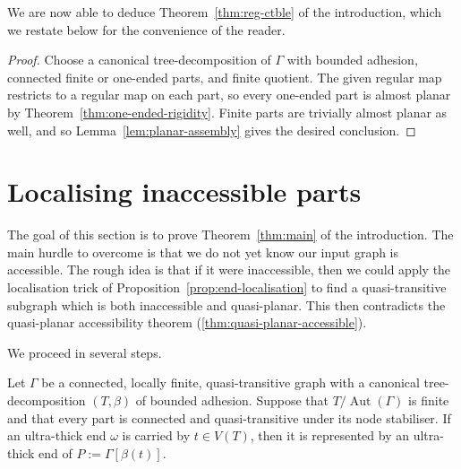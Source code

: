 \documentclass[a4paper]{amsart}
\begin{document}
We are now able to deduce Theorem~\ref{thm:reg-ctble} of the introduction, which we restate below for the convenience of the reader. 

\regctble*

\begin{proof}
Choose a canonical tree-decomposition of $\Gamma$ with bounded adhesion, connected finite or one-ended parts,  and finite quotient.
The given regular map restricts to a regular map on each part, so every one-ended part is almost planar by Theorem~\ref{thm:one-ended-rigidity}.
Finite parts are trivially almost planar as well, and so Lemma~\ref{lem:planar-assembly} gives the desired conclusion.
\end{proof}

\section{Localising inaccessible parts}\label{sec:accessibility}

The goal of this section is to prove Theorem~\ref{thm:main} of the introduction. The main hurdle to overcome is that we do not yet know our input graph is accessible. The rough idea is that if it were inaccessible, then we could apply the localisation trick of Proposition~\ref{prop:end-localisation} to find a quasi-transitive subgraph which is both inaccessible and quasi-planar. This then contradicts the quasi-planar accessibility theorem (\ref{thm:quasi-planar-accessible}). 

We proceed in several steps. 


\begin{lemma}\label{lem:ultra-thick-in-part}
Let $\Gamma$ be a connected, locally finite, quasi-transitive graph with a canonical tree-decomposition $(T,\beta)$ of bounded adhesion.
Suppose that $T/\operatorname{Aut}(\Gamma)$ is finite and that every part is connected and quasi-transitive under its node stabiliser.
If an ultra-thick end $\omega$ is carried by $t\in V(T)$, then it is represented by an ultra-thick end of $P:=\Gamma[\beta(t)]$.
\end{lemma}
\end{document}

